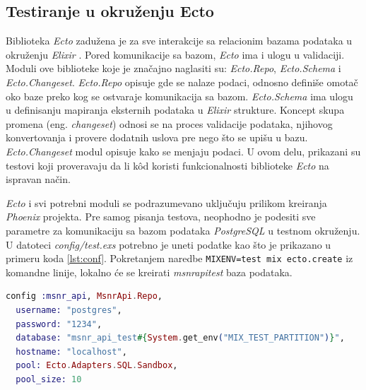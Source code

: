 \documentclass[12pt,oneside]{memoir}
\begin{document}
\subsection{Testiranje u okruženju Ecto}
\par Biblioteka \emph{Ecto} zadužena je za sve interakcije sa relacionim bazama podataka u okruženju \emph{Elixir} \cite{ecto}. Pored komunikacije sa bazom, \emph{Ecto} ima i ulogu u validaciji. Moduli ove biblioteke koje je značajno naglasiti su: \emph{Ecto.Repo}, \emph{Ecto.Schema} i \emph{Ecto.Changeset}. \emph{Ecto.Repo} opisuje gde se nalaze podaci, odnosno definiše omotač oko baze preko kog se ostvaraje komunikacija sa bazom. \emph{Ecto.Schema} ima ulogu u definisanju mapiranja eksternih podataka u \emph{Elixir} strukture. Koncept skupa promena (eng. \emph{changeset}) odnosi se na proces validacije podataka, njihovog konvertovanja i provere dodatnih uslova pre nego što se upišu u bazu. \emph{Ecto.Changeset} modul opisuje kako se menjaju podaci. U ovom delu, prikazani su testovi koji proveravaju da li k\^{o}d koristi funkcionalnosti biblioteke \emph{Ecto} na ispravan način.
\par \emph{Ecto} i svi potrebni moduli se podrazumevano uključuju prilikom kreiranja \emph{Phoenix} projekta. Pre samog pisanja testova, neophodno je podesiti sve parametre za komunikaciju sa bazom podataka \emph{PostgreSQL} u testnom okruženju. U datoteci \emph{config/test.exs} potrebno je uneti podatke kao što je prikazano u primeru koda \ref{lst:conf}. Pokretanjem naredbe \texttt{MIX{\textunderscore}ENV=test mix ecto.create} iz komandne linije, lokalno će se kreirati \emph{msnr{\textunderscore}api{\textunderscore}test} baza podataka.  \\

\begin{minipage}{\linewidth}
\begin{lstlisting}[language=elixir, basicstyle=\small, caption={Konfiguracija baze podataka u testnom okruženju},captionpos=b, label={lst:conf}]
  config :msnr_api, MsnrApi.Repo,
  username: "postgres",
  password: "1234",
  database: "msnr_api_test#{System.get_env("MIX_TEST_PARTITION")}",
  hostname: "localhost",
  pool: Ecto.Adapters.SQL.Sandbox,
  pool_size: 10
\end{lstlisting}
\end{minipage}
\end{document}
